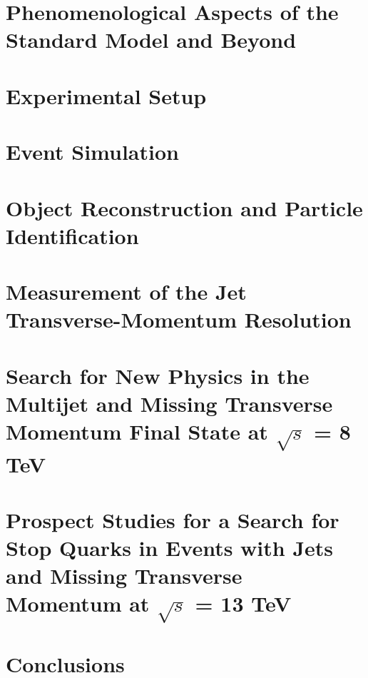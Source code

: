 \documentclass[
twoside,
headsepline,     %
headings=normal,
openright,
numbers=noenddot, %
a4paper
]{scrreprt} %
\begin{document}
\chapter{Phenomenological Aspects of the Standard Model and Beyond} \label{chap:Theory}


\chapter{Experimental Setup} \label{chap:Detector}


\chapter{Event Simulation} \label{chap:Simulation}


\chapter{Object Reconstruction and Particle Identification} \label{chap:Objects}


\chapter{Measurement of the Jet Transverse-Momentum Resolution} \label{chap:Resolution}


\chapter[Search for New Physics with Jets and Missing Transverse Momentum]{Search for New Physics in the Multijet and Missing Transverse Momentum Final State at $\sqrt{s}$ = 8 TeV} \label{chap:RA2}


\chapter[Prospect Studies for a Search for Top Squarks at $\sqrt{s}$ = 13 TeV]{Prospect Studies for a Search for Stop Quarks in Events with Jets and Missing Transverse Momentum at $\sqrt{s}$ = 13 TeV} \label{chap:Stop}


\chapter{Conclusions} \label{chap:Conclusion}

\end{document}
